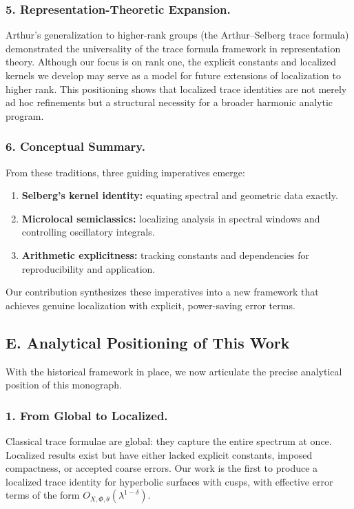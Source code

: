 \subsubsection*{5. Representation-Theoretic Expansion.}
Arthur’s generalization to higher-rank groups (the Arthur–Selberg trace formula) \cite{ArthurBook} 
demonstrated the universality of the trace formula framework in representation theory. 
Although our focus is on rank one, the explicit constants and localized kernels we develop may serve as a model 
for future extensions of localization to higher rank. 
This positioning shows that localized trace identities are not merely ad hoc refinements 
but a structural necessity for a broader harmonic analytic program.

\subsubsection*{6. Conceptual Summary.}
From these traditions, three guiding imperatives emerge:
\begin{enumerate}[label=\arabic*.]
  \item \textbf{Selberg’s kernel identity:} equating spectral and geometric data exactly.
  \item \textbf{Microlocal semiclassics:} localizing analysis in spectral windows and controlling oscillatory integrals.
  \item \textbf{Arithmetic explicitness:} tracking constants and dependencies for reproducibility and application.
\end{enumerate}
Our contribution synthesizes these imperatives into a new framework that achieves genuine localization with explicit, power-saving error terms.

\medskip

\subsection*{E. Analytical Positioning of This Work}

With the historical framework in place, we now articulate the precise analytical position of this monograph.

\subsubsection*{1. From Global to Localized.}
Classical trace formulae are global: they capture the entire spectrum at once. 
Localized results exist but have either lacked explicit constants, imposed compactness, or accepted coarse errors. 
Our work is the first to produce a localized trace identity for hyperbolic surfaces with cusps, 
with effective error terms of the form $O_{X,\Phi,\theta}(\lambda^{1-\delta})$. 

